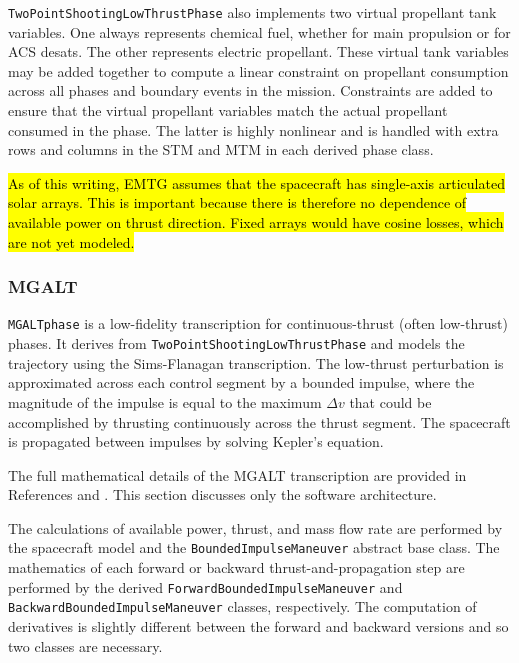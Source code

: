 \texttt{TwoPointShootingLowThrustPhase} also implements two virtual propellant tank variables. One always represents chemical fuel, whether for main propulsion or for \ac{ACS} desats. The other represents electric propellant. These virtual tank variables may be added together to compute a linear constraint on propellant consumption across all phases and boundary events in the mission. Constraints are added to ensure that the virtual propellant variables match the actual propellant consumed in the phase. The latter is highly nonlinear and is handled with extra rows and columns in the \ac{STM} and \ac{MTM} in each derived phase class.

\hl{As of this writing, EMTG assumes that the spacecraft has single-axis articulated solar arrays. This is important because there is therefore no dependence of available power on thrust direction. Fixed arrays would have cosine losses, which are not yet modeled.}

\subsubsection{MGALT}
\label{subsubsec:MGALT}

\texttt{MGALTphase} is a low-fidelity transcription for continuous-thrust (often low-thrust) phases. It derives from \texttt{TwoPointShootingLowThrustPhase} and models the trajectory using the Sims-Flanagan transcription. The low-thrust perturbation is approximated across each control segment by a bounded impulse, where the magnitude of the impulse is equal to the maximum $\Delta v$ that could be accomplished by thrusting continuously across the thrust segment. The spacecraft is propagated between impulses by solving Kepler's equation.

The full mathematical details of the \ac{MGALT} transcription are provided in References \cite{BoundedImpulseDerivatives1} and \cite{BoundedImpulseDerivatives2}. This section discusses only the software architecture.

The calculations of available power, thrust, and mass flow rate are performed by the spacecraft model and the \texttt{BoundedImpulseManeuver} abstract base class. The mathematics of each forward or backward thrust-and-propagation step are performed by the derived \texttt{ForwardBoundedImpulseManeuver} and \texttt{BackwardBoundedImpulseManeuver} classes, respectively. The computation of derivatives is slightly different between the forward and backward versions and so two classes are necessary.

